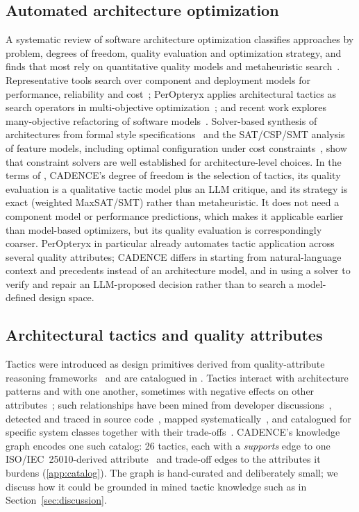 \documentclass[preprint,12pt,authoryear]{elsarticle}
\renewcommand{\_}{\textunderscore\allowbreak{}}
\begin{document}
\subsection{Automated architecture optimization}

A systematic review of software architecture optimization classifies approaches by problem, degrees of freedom, quality evaluation and optimization strategy, and finds that most rely on quantitative quality models and metaheuristic search~\citep{aleti2013}. Representative tools search over component and deployment models for performance, reliability and cost~\citep{martens2010,aleti2009archeopterix}; PerOpteryx applies architectural tactics as search operators in multi-objective optimization~\citep{koziolek2011peropteryx}; and recent work explores many-objective refactoring of software models~\citep{cortellessa2023}. Solver-based synthesis of architectures from formal style specifications~\citep{bagheri2016} and the SAT/CSP/SMT analysis of feature models, including optimal configuration under cost constraints~\citep{benavides2010}, show that constraint solvers are well established for architecture-level choices. In the terms of \citet{aleti2013}, CADENCE's degree of freedom is the selection of tactics, its quality evaluation is a qualitative tactic model plus an LLM critique, and its strategy is exact (weighted MaxSAT/SMT) rather than metaheuristic. It does not need a component model or performance predictions, which makes it applicable earlier than model-based optimizers, but its quality evaluation is correspondingly coarser. PerOpteryx in particular already automates tactic application across several quality attributes; CADENCE differs in starting from natural-language context and precedents instead of an architecture model, and in using a solver to verify and repair an LLM-proposed decision rather than to search a model-defined design space.

\subsection{Architectural tactics and quality attributes}

Tactics were introduced as design primitives derived from quality-attribute reasoning frameworks~\citep{bachmann2003} and are catalogued in \citet{bass2021saip}. Tactics interact with architecture patterns and with one another, sometimes with negative effects on other attributes~\citep{harrison2010,harrison2007}; such relationships have been mined from developer discussions~\citep{bi2021}, detected and traced in source code~\citep{mirakhorli2012,mirakhorli2016}, mapped systematically~\citep{marquez2023}, and catalogued for specific system classes together with their trade-offs~\citep{indykov2025}. CADENCE's knowledge graph encodes one such catalog: 26 tactics, each with a \emph{supports} edge to one ISO/IEC~25010-derived attribute~\citep{iso25010} and trade-off edges to the attributes it burdens (\ref{app:catalog}). The graph is hand-curated and deliberately small; we discuss how it could be grounded in mined tactic knowledge such as \citet{bi2021} in Section~\ref{sec:discussion}.
\end{document}

